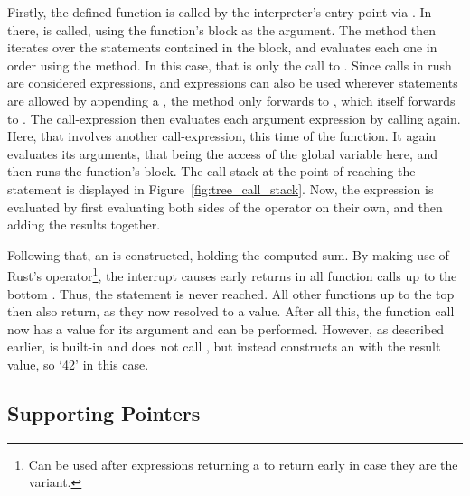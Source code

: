 Firstly, the defined  function is called by the interpreter's entry point via .
In there,  is called, using the  function's block as the argument.
The  method then iterates over the statements contained in the block, and evaluates each one in order using the  method.
In this case, that is only the call to .
Since calls in rush are considered expressions, and expressions can also be used wherever statements are allowed by appending a \qVerb{;}, the  method only forwards to , which itself forwards to .
The call-expression then evaluates each argument expression by calling  again.
Here, that involves another call-expression, this time of the  function.
It again evaluates its arguments, that being the access of the global variable  here, and then runs the function's block.
The call stack at the point of reaching the  statement is displayed in Figure~\ref{fig:tree_call_stack}.
Now, the expression  is evaluated by first evaluating both sides of the \qVerb{+} operator on their own, and then adding the results together.

Following that, an  is constructed, holding the computed sum.
By making use of Rust's  operator\footnote{Can be used after expressions returning a  to return early in case they are the  variant.}, the interrupt causes early returns in all function calls up to the bottom .
Thus, the statement  is never reached.
All other functions up to the top  then also return, as they now resolved to a value.
After all this, the  function call now has a value for its argument and can be performed.
However, as described earlier,  is built-in and does not call , but instead constructs an  with the result value, so `42' in this case.

\subsection{Supporting Pointers}\label{sec:tree_pointers}

